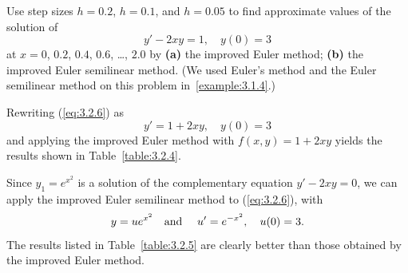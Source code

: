 \setcounter{example}{3}
\setcounter{equation}{5}
\begin{example}
  \label{example:3.2.4} \rm Use step sizes $h=0.2$, $h=0.1$, and $h=0.05$ to find approximate values
  of the solution of
  \begin{equation}
    \label{eq:3.2.6}y'-2xy=1,\quad y(0)=3
  \end{equation}
  at $x=0$, $0.2$, $0.4$, $0.6$, \dots, $2.0$ by {\bf (a)} the improved Euler method; {\bf (b)} the
  improved Euler semilinear method. (We used Euler's method and the Euler semilinear method on this
  problem in~\ref{example:3.1.4}.)
\end{example}
\setcounter{table}{3}
\begin{examplesolution}
 Rewriting (\ref{eq:3.2.6}) as
\[
  y'=1+2xy,\quad y(0)=3
\]
and applying the improved Euler method with $f(x,y)=1+2xy$ yields the results shown in
Table~\ref{table:3.2.4}.

 Since $y_{1}=e^{x^{2}}$ is a solution of the complementary equation $y'-2xy=0$, we
can apply the improved Euler semilinear method to (\ref{eq:3.2.6}), with
\[
  y=ue^{x^{2}}\mbox{\quad and \quad}u'=e^{-x^{2}},\quad u(0)=3.
\]
The results listed in Table~\ref{table:3.2.5} are clearly better than those obtained by the improved
Euler method.


\end{examplesolution}
